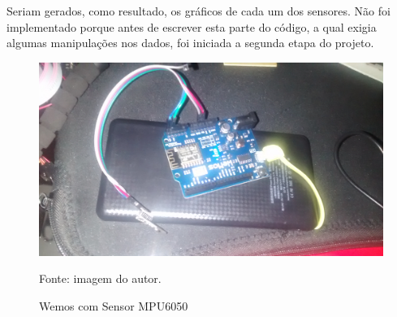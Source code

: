 	Seriam gerados, como resultado, os gráficos de cada um dos sensores. Não foi implementado porque antes de escrever esta parte do código, a qual exigia algumas manipulações nos dados, foi iniciada a segunda etapa do projeto. 
	
	\begin{figure}[h]
		\centering
		\includegraphics[keepaspectratio=true,scale=0.075]{figuras/wemos1.jpg}
		\caption{Wemos com Sensor MPU6050}
		\footnotesize Fonte: imagem do autor. 
		\label{wemos1}	
	\end{figure}
	
